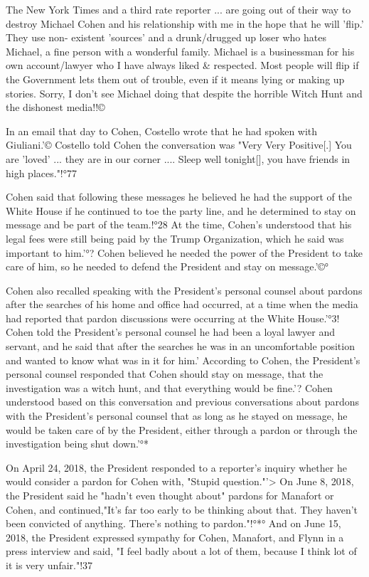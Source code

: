 The New York Times and a third rate reporter ... are going out of their way to destroy Michael Cohen and his relationship with me in the hope that he will 'flip.'
They use non- existent 'sources' and a drunk/drugged up loser who hates Michael, a fine person with a wonderful family.
Michael is a businessman for his own account/lawyer who I have always liked \& respected.
Most people will flip if the Government lets them out of trouble, even if it means lying or making up stories.
Sorry, I don't see Michael doing that despite the horrible Witch Hunt and the dishonest media!!©%

In an email that day to Cohen, Costello wrote that he had spoken with Giuliani.'©
Costello told Cohen the conversation was "Very Very Positive[.] You are 'loved' ... they are in our corner .... Sleep well tonight[], you have friends in high places."!°77

Cohen said that following these messages he believed he had the support of the White House if he continued to toe the party line, and he determined to stay on message and be part of the team.!°28
At the time, Cohen's understood that his legal fees were still being paid by the Trump Organization, which he said was important to him.'°?
Cohen believed he needed the power of the President to take care of him, so he needed to defend the President and stay on message.'©°

Cohen also recalled speaking with the President's personal counsel about pardons after the searches of his home and office had occurred, at a time when the media had reported that pardon discussions were occurring at the White House.'°3!
Cohen told the President's personal counsel he had been a loyal lawyer and servant, and he said that after the searches he was in an uncomfortable position and wanted to know what was in it for him.'%
According to Cohen, the President's personal counsel responded that Cohen should stay on message, that the investigation was a witch hunt, and that everything would be fine.'?
Cohen understood based on this conversation and previous conversations about pardons with the President's personal counsel that as long as he stayed on message, he would be taken care of by the President, either through a pardon or through the investigation being shut down.'°*

On April 24, 2018, the President responded to a reporter's inquiry whether he would consider a pardon for Cohen with, "Stupid question."'>
On June 8, 2018, the President said he "hadn't even thought about" pardons for Manafort or Cohen, and continued,"It's far too early to be thinking about that.
They haven't been convicted of anything.
There's nothing to pardon."!°*°
And on June 15, 2018, the President expressed sympathy for Cohen, Manafort, and Flynn in a press interview and said, "I feel badly about a lot of them, because I think lot of it is very unfair."!37

